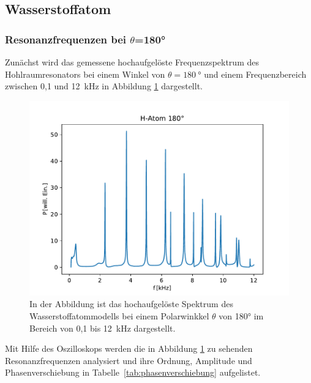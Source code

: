     \subsection{Wasserstoffatom}
        \subsubsection*{Resonanzfrequenzen bei $\theta$=180°}
            Zunächst wird das gemessene hochaufgelöste Frequenzspektrum des Hohlraumresonators bei einem Winkel von $\theta=\SI{180}{\degree}$ und einem Frequenzbereich zwischen 0,1 und \SI{12}{\kilo\hertz}
            in Abbildung \ref{fig:hatom_180} dargestellt.
            \begin{figure}[ht!]
                \centering
                \includegraphics[scale=0.6]{./pictures/hatom_180.pdf}
                \caption{In der Abbildung ist das hochaufgelöste Spektrum des Wasserstoffatommodells bei einem Polarwinkkel $\theta$ von 180° im Bereich von 0,1 bis \SI{12}{\kilo\hertz} dargestellt.}
                \label{fig:hatom_180}
            \end{figure}

            \FloatBarrier
            Mit Hilfe des Oszilloskops werden die in Abbildung \ref{fig:hatom_180} zu sehenden Resonanzfrequenzen analysiert und ihre Ordnung, Amplitude und Phasenverschiebung in Tabelle~\ref{tab:phasenverschiebung} 
            aufgelistet.
            \FloatBarrier
        \newpage
